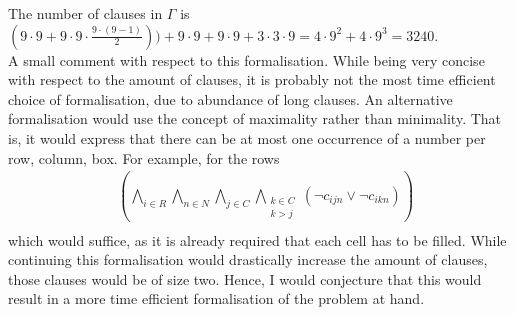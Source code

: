 \documentclass[11pt,a4paper]{article}
\begin{document}
The number of clauses in $\Gamma$ is $(9\cdot 9 + 9\cdot 9 \cdot \frac{9\cdot(9-1)}{2})) + 9\cdot 9 + 9\cdot 9 + 3 \cdot 3 \cdot 9 = 4\cdot 9^2 +4 \cdot  9^3 = 3240$.\\

A small comment with respect to this formalisation. While being very concise with respect to the amount of clauses, it is probably not the most time efficient choice of formalisation, due to abundance of long clauses. An alternative formalisation would use the concept of maximality rather than minimality. That is, it would express that there can be at most one occurrence of a number per row, column, box. For example, for the rows
\begin{equation*}
\begin{split}
&(\bigwedge_{i \in R} \bigwedge_{n \in N}  \bigwedge_{j \in C} \bigwedge_{\substack{k \in C \\ k>j}}(\neg c_{ijn} \lor \neg c_{ikn}))  \\
\end{split}
\end{equation*}
which would suffice, as it is already required that each cell has to be filled. While continuing this formalisation would drastically increase the amount of clauses, those clauses would be of size two. Hence, I would conjecture that this would result in a more time efficient formalisation of the problem at hand. \\
\end{document}

